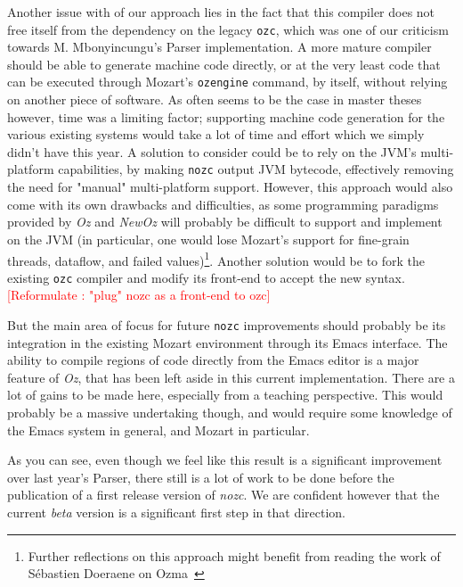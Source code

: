 Another issue with of our approach lies in the fact that this compiler does not free itself from the dependency on the legacy \texttt{ozc}, which was one of our criticism towards M. Mbonyincungu's Parser implementation.
A more mature compiler should be able to generate machine code directly, or at the very least code that can be executed through Mozart's \texttt{ozengine} command, by itself, without relying on another piece of software.
As often seems to be the case in master theses however, time was a limiting factor;
supporting machine code generation for the various existing systems would take a lot of time and effort which we simply didn't have this year.\newline
A solution to consider could be to rely on the JVM's multi-platform capabilities, by making \texttt{nozc} output JVM bytecode, effectively removing the need for  "manual" multi-platform support.
However, this approach would also come with its own drawbacks and difficulties, as some programming paradigms provided by \textit{Oz} and \textit{NewOz} will probably be difficult to support and implement on the JVM (in particular, one would lose Mozart's support for fine-grain threads, dataflow, and failed values)\footnote{Further reflections on this approach might benefit from reading the work of Sébastien Doeraene on Ozma~\cite{Ozma}}.\newline
Another solution would be to fork the existing \texttt{ozc} compiler and modify its front-end to accept the new syntax. \textcolor{red}{[Reformulate : "plug" nozc as a front-end to ozc]}\newline

But the main area of focus for future \texttt{nozc} improvements should probably be its integration in the existing Mozart environment through its Emacs interface.
The ability to compile regions of code directly from the Emacs editor is a major feature of \textit{Oz}, that has been left aside in this current implementation.
There are a lot of gains to be made here, especially from a teaching perspective.
This would probably be a massive undertaking though, and would require some knowledge of the Emacs system in general, and Mozart in particular.\newline

As you can see, even though we feel like this result is a significant improvement over last year's Parser, there still is a lot of work to be done before the publication of a first release version of \textit{nozc}.
We are confident however that the current \textit{beta} version is a significant first step in that direction.